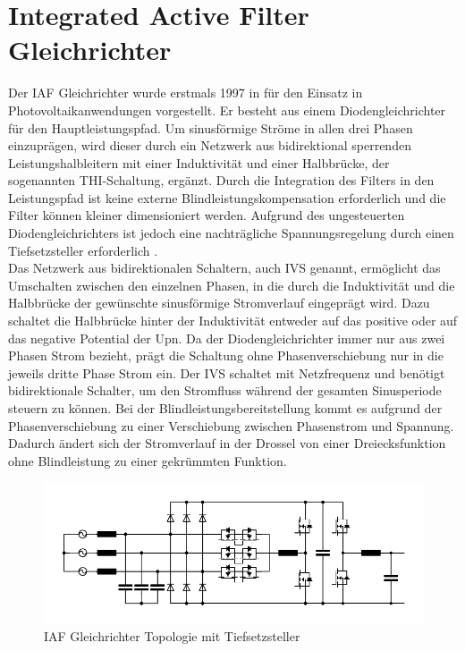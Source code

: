 \section{Integrated Active Filter Gleichrichter}
	Der \gls{IAF} Gleichrichter wurde erstmals 1997 in \cite{IAFfirst} für den Einsatz in Photovoltaikanwendungen vorgestellt. Er besteht aus einem Diodengleichrichter für den Hauptleistungspfad. Um sinusförmige Ströme in allen drei Phasen einzuprägen, wird dieser durch ein Netzwerk aus bidirektional sperrenden Leistungshalbleitern mit einer Induktivität und einer Halbbrücke, der sogenannten THI-Schaltung, ergänzt. Durch die Integration des Filters in den Leistungspfad ist keine externe Blindleistungskompensation erforderlich und die Filter können kleiner dimensioniert werden. Aufgrund des ungesteuerten Diodengleichrichters ist jedoch eine nachträgliche Spannungsregelung durch einen Tiefsetzsteller erforderlich \cite{ThesisSchrittwieserBuckTypePFC_2017}.\\
	Das Netzwerk aus bidirektionalen Schaltern, auch \gls{IVS} genannt, ermöglicht das Umschalten zwischen den einzelnen Phasen, in die durch die Induktivität und die Halbbrücke der gewünschte sinusförmige Stromverlauf eingeprägt wird. Dazu schaltet die Halbbrücke hinter der Induktivität entweder auf das positive oder auf das negative Potential der \gls{Upn}. Da der Diodengleichrichter immer nur aus zwei Phasen Strom bezieht, prägt die Schaltung ohne Phasenverschiebung nur in die jeweils dritte Phase Strom ein. Der \gls{IVS} schaltet mit Netzfrequenz und benötigt bidirektionale Schalter, um den Stromfluss während der gesamten Sinusperiode steuern zu können. Bei der Blindleistungsbereitstellung kommt es aufgrund der Phasenverschiebung zu einer Verschiebung zwischen Phasenstrom und Spannung. Dadurch ändert sich der Stromverlauf in der Drossel von einer Dreiecksfunktion ohne Blindleistung zu einer gekrümmten Funktion.
	\begin{figure}
		\centering
		\includegraphics[width=0.9\linewidth]{content/Grafiken/IAF}
		\caption{\gls{IAF} Gleichrichter Topologie mit Tiefsetzsteller}
		\label{fig:iaf}
	\end{figure}


